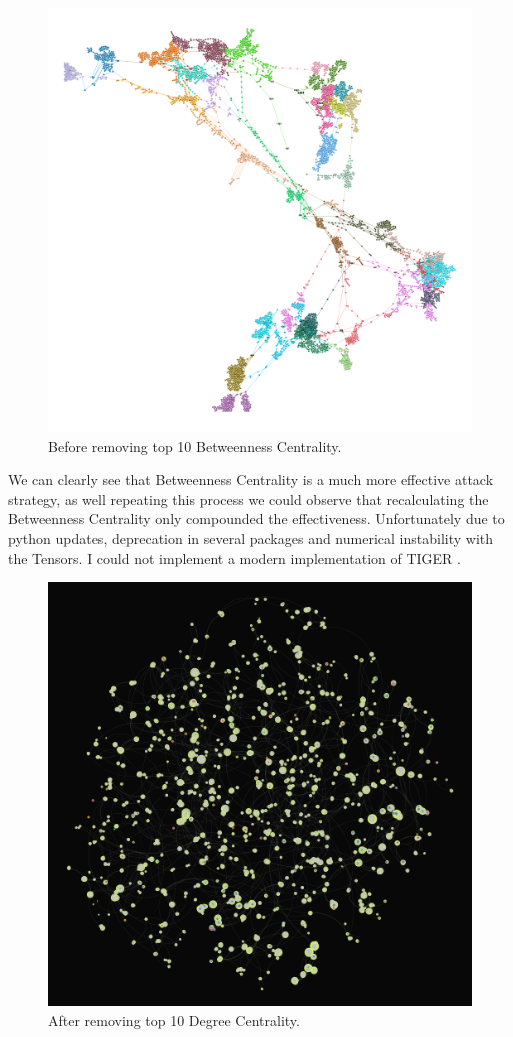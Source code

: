 \documentclass[10pt,twocolumn,letterpaper]{article}
\begin{document}
\begin{figure}[t]
    \centering
    \includegraphics[width=0.8\linewidth]{images/PowerGrid_Targeted.png}
    \caption{Before removing top 10 Betweenness Centrality.}
    \label{fig:onecol}
\end{figure}

We can clearly see that Betweenness Centrality is a much more effective attack strategy, as well repeating this process we could observe that recalculating the Betweenness Centrality only compounded the effectiveness. Unfortunately due to python updates, deprecation in several packages and numerical instability with the Tensors. I could not implement a modern implementation of TIGER \cite{freitas2021evaluating}.


\begin{figure}[t]
    \centering
    \includegraphics[width=0.8\linewidth]{images/Degree_power-targeted.png}
    \caption{After removing top 10 Degree Centrality.}
    \label{fig:onecol}
\end{figure}
\end{document}
